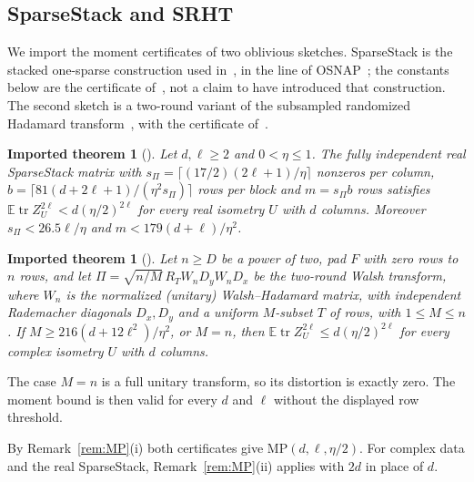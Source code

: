 \documentclass[11pt]{article}
\newtheorem{imported}[theorem]{Imported theorem}
\theoremstyle{definition}\newtheorem{definition}[theorem]{Definition}
\theoremstyle{remark}\newtheorem{remark}[theorem]{Remark}
\newcommand{\E}{\mathbb E}
\newcommand{\tr}{\operatorname{tr}}
\newcommand{\1}{\mathbf 1}
\newcommand{\MP}{\mathrm{MP}}
\begin{document}
\subsection{SparseStack and SRHT}
We import the moment certificates of two oblivious sketches. SparseStack
is the stacked one-sparse construction used in~\cite{CEMT,EpperlyARP},
in the line of OSNAP~\cite{NN13}; the constants below are the certificate
of~\cite{SparseStack}, not a claim to have introduced that construction.
The second sketch is a two-round variant of the subsampled randomized
Hadamard transform~\cite{Tropp11}, with the certificate
of~\cite{SRHThybrid}.

\begin{imported}[{\cite[Theorem 10.6 and Appendix B.4--B.5]{SparseStack}}]\label{imp:sparsestack}
Let $d,\ell\ge2$ and $0<\eta\le1$. The fully independent real SparseStack
matrix with $s_\Pi=\lceil(17/2)(2\ell+1)/\eta\rceil$ nonzeros per column,
$b=\lceil81(d+2\ell+1)/(\eta^2s_\Pi)\rceil$ rows per block and
$m=s_\Pi b$ rows satisfies $\E\tr Z_U^{2\ell}<d(\eta/2)^{2\ell}$ for every
real isometry $U$ with $d$ columns. Moreover $s_\Pi<26.5\ell/\eta$ and
$m<179(d+\ell)/\eta^2$.
\end{imported}

\begin{imported}[{\cite[Equation (5.6) and Theorem 1.1]{SRHThybrid}}]\label{imp:srht}
Let $n\ge D$ be a power of two, pad $F$ with zero rows to $n$ rows, and
let $\Pi=\sqrt{n/M}\,R_TW_nD_yW_nD_x$ be the two-round Walsh transform, where $W_n$ is the normalized (unitary) Walsh--Hadamard matrix,
with independent Rademacher diagonals $D_x,D_y$ and a uniform
$M$-subset $T$ of rows, with $1\le M\le n$. If
$M\ge216(d+12\ell^2)/\eta^2$, or $M=n$, then
$\E\tr Z_U^{2\ell}\le d(\eta/2)^{2\ell}$ for every complex isometry $U$
with $d$ columns.
\end{imported}

The case $M=n$ is a full unitary transform, so its distortion is exactly
zero. The moment bound is then valid for every $d$ and $\ell$ without
the displayed row threshold.

By Remark~\ref{rem:MP}(i) both certificates give
$\MP(d,\ell,\eta/2)$. For complex data and the real SparseStack,
Remark~\ref{rem:MP}(ii) applies with $2d$ in place of $d$.
\end{document}
